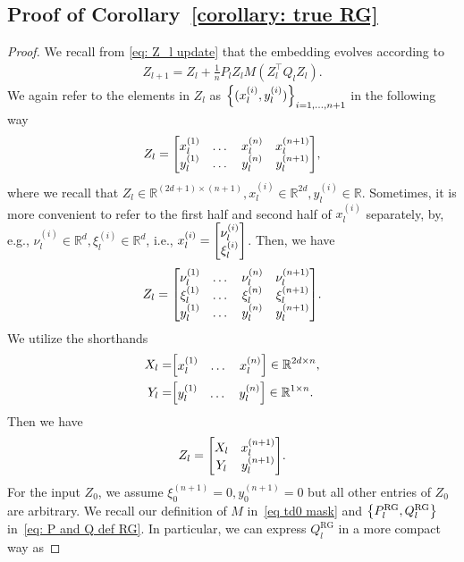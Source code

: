 \documentclass{article}
\newcommand{\R}{\mathbb{R}}
\newcommand{\rg}{\text{RG}}
\begin{document}
\subsection{Proof of Corollary~\ref{corollary: true RG}}
\label{sec proof of corollary true RG}
\begin{proof}
    We recall from \eqref{eq: Z_l update} that the embedding evolves according to
    \begin{align}
        Z_{l+1} = Z_l + \frac{1}{n} P_l Z_l M(Z_l^\top Q_l Z_l).
    \end{align}
    We again refer to the elements in $Z_l$ as $\qty{(x^{(i)}_l, y^{(i)}_l)}_{i=1,\dots, n+1}$ in the following way
    \begin{align}
        Z_l = \mqty[x_l^{(1)} & \dots & x_l^{(n)} & x_l^{(n+1)} \\ 
                    y_l^{(1)} & \dots & y_l^{(n)} & y_l^{(n+1)}],
    \end{align}
    where we recall that $Z_l \in \R^{(2d + 1) \times (n+1)}, x_l^{(i)} \in \R^{2d}, y^{(i)}_l \in \R$.
    Sometimes, it is more convenient to refer to the first half and second half of $x_l^{(i)}$ separately, 
    by, e.g., $\nu^{(i)}_l \in \R^d, \xi_l^{(i)} \in \R^d$, i.e., $x_l^{(i)} = \mqty[\nu_l^{(i)} \\ \xi_l^{(i)}]$.
    Then, we have
    \begin{align}
        Z_l = \mqty[\nu_l^{(1)} & \dots & \nu_l^{(n)} & \nu_l^{(n+1)} \\
        \xi_l^{(1)} & \dots & \xi_l^{(n)} & \xi_l^{(n+1)} \\
         y_l^{(1)} & \dots & y_l^{(n)} & y_l^{(n+1)}].
    \end{align}
    We utilize the shorthands
    \begin{align}
        X_l =& \mqty[x_l^{(1)} & \dots & x_l^{(n)}] \in \R^{2d \times n}, \\
        Y_l =&  \mqty[y_l^{(1)} & \dots & y_l^{(n)}] \in \R^{1 \times n}.
    \end{align}
    Then we have
    \begin{align}
        Z_l = \mqty[X_l & x_l^{(n+1)} \\ 
                    Y_l & y_l^{(n+1)}].
    \end{align}
    For the input $Z_0$,
    we assume $\xi_0^{(n+1)} = 0, y_0^{(n+1)} = 0$ but all other entries of $Z_0$ are arbitrary.
    We recall our definition of $M$ in~\eqref{eq td0 mask} and $\qty{P_l^{\rg}, Q_l^{\rg}}$ in~\eqref{eq: P and Q def RG}.
    In particular,
    we can express $Q_l^{\rg}$ in a more compact way as

\end{proof}
\end{document}
